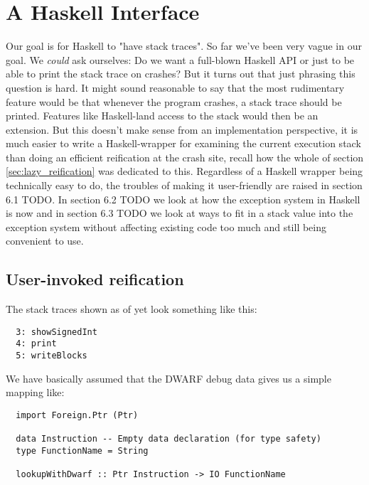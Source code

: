 \chapter{A Haskell Interface}

Our goal is for Haskell to "have stack traces". So far we've been
very vague in our goal. We \emph{could} ask ourselves: Do we want a
full-blown Haskell API or just to be able to print the stack trace on
crashes? %
But it turns out that just phrasing this question is hard.
It might sound reasonable to say that the most rudimentary feature
would be that whenever the program crashes, a stack trace should be
printed. Features like Haskell-land access to the stack would then
be an extension. But this doesn't make sense from an implementation
perspective, it is much easier to write a Haskell-wrapper for examining
the current execution stack than doing an efficient reification at the
crash site, recall how the whole of section \ref{sec:lazy_reification}
was dedicated to this. Regardless of a Haskell wrapper being technically
easy to do,
the troubles of making it user-friendly are 
raised in section 6.1 TODO. In section
6.2 TODO we look at how the exception system in Haskell is now and
in section 6.3 TODO we look at ways to fit in a stack value into the
exception system without affecting existing code too much and still
being convenient to use.


\section{User-invoked reification}

The stack traces shown as of yet look something like this:

\begin{verbatim}
  3: showSignedInt
  4: print
  5: writeBlocks
\end{verbatim}

We have basically assumed that the DWARF debug data gives us a simple
mapping like:

\begin{verbatim}
  import Foreign.Ptr (Ptr)

  data Instruction -- Empty data declaration (for type safety)
  type FunctionName = String

  lookupWithDwarf :: Ptr Instruction -> IO FunctionName
\end{verbatim}

